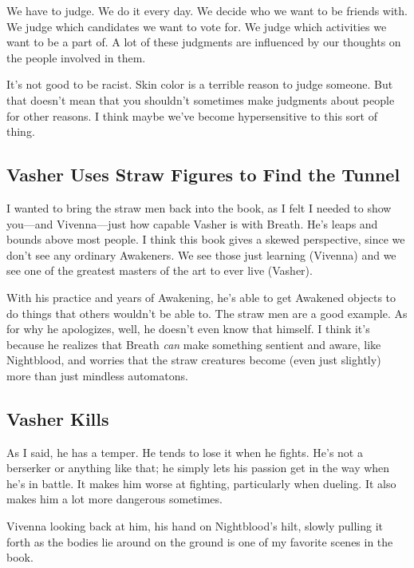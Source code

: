 We have to judge. We do it every day. We decide who we want to be friends with. We judge which candidates we want to vote for. We judge which activities we want to be a part of. A lot of these judgments are influenced by our thoughts on the people involved in them.

It’s not good to be racist. Skin color is a terrible reason to judge someone. But that doesn’t mean that you shouldn’t sometimes make judgments about people for other reasons. I think maybe we’ve become hypersensitive to this sort of thing.

\subsection*{Vasher Uses Straw Figures to Find the Tunnel}

I wanted to bring the straw men back into the book, as I felt I needed to show you—and Vivenna—just how capable Vasher is with Breath. He’s leaps and bounds above most people. I think this book gives a skewed perspective, since we don’t see any ordinary Awakeners. We see those just learning (Vivenna) and we see one of the greatest masters of the art to ever live (Vasher).

With his practice and years of Awakening, he’s able to get Awakened objects to do things that others wouldn’t be able to. The straw men are a good example. As for why he apologizes, well, he doesn’t even know that himself. I think it’s because he realizes that Breath \textit{can} make something sentient and aware, like Nightblood, and worries that the straw creatures become (even just slightly) more than just mindless automatons.

\subsection*{Vasher Kills}

As I said, he has a temper. He tends to lose it when he fights. He’s not a berserker or anything like that; he simply lets his passion get in the way when he’s in battle. It makes him worse at fighting, particularly when dueling. It also makes him a lot more dangerous sometimes.

Vivenna looking back at him, his hand on Nightblood’s hilt, slowly pulling it forth as the bodies lie around on the ground is one of my favorite scenes in the book.



